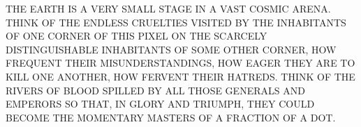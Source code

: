 {\begin{testcases}
{THE EARTH IS A VERY SMALL STAGE IN A VAST COSMIC ARENA. THINK OF THE ENDLESS CRUELTIES VISITED BY THE INHABITANTS OF ONE CORNER OF THIS PIXEL ON THE SCARCELY DISTINGUISHABLE INHABITANTS OF SOME OTHER CORNER, HOW FREQUENT THEIR MISUNDERSTANDINGS, HOW EAGER THEY ARE TO KILL ONE ANOTHER, HOW FERVENT THEIR HATREDS. THINK OF THE RIVERS OF BLOOD SPILLED BY ALL THOSE GENERALS AND EMPERORS SO THAT, IN GLORY AND TRIUMPH, THEY COULD BECOME THE MOMENTARY MASTERS OF A FRACTION OF A DOT.}

\end{testcases}}
